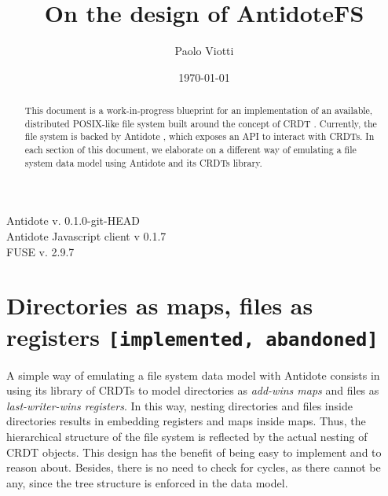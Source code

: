 \documentclass[11pt]{article}
\title{On the design of AntidoteFS}
\author{Paolo Viotti}
\date{\today}
\newcommand{\status}[1]{{\texttt{\footnotesize [#1]}}}
\begin{document}
\maketitle

\begin{abstract}
This document is a work-in-progress blueprint
for an implementation of an available, distributed POSIX-like file system \cite{posix}
built around the concept of CRDT \cite{crdts-sss}.
Currently, the file system is backed by Antidote \cite{antidote-web},
which exposes an API to interact with CRDTs.
In each section of this document, we elaborate on a different 
way of emulating a file system data model using Antidote 
and its CRDTs library.
\end{abstract}

\begin{flushright}
{\footnotesize \ttfamily
\noindent
Antidote v. 0.1.0-git-HEAD\\
Antidote Javascript client v 0.1.7\\
FUSE v. 2.9.7
}
\end{flushright}


\section{Directories as maps, files as registers \status{implemented, abandoned}}
\label{sec:design1}
A simple way of emulating a file system data model with Antidote
consists in using its library of CRDTs to model directories as \textit{add-wins maps} %
and files as \textit{last-writer-wins registers}. %
%
In this way, nesting directories and files inside directories results in
embedding registers and maps inside maps.
Thus, the hierarchical structure of the file system is 
reflected by the actual nesting of CRDT objects.
%
This design has the benefit of being easy to implement and to reason about.
Besides, there is no need to check for cycles, as there cannot be any, since the tree structure is 
enforced in the data model.
\end{document}
